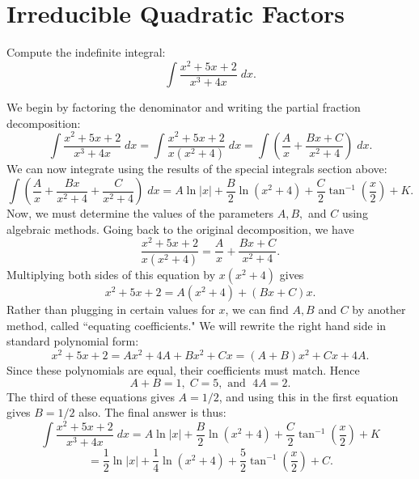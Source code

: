 \documentclass{ximera}
\begin{document}
\section{Irreducible Quadratic Factors}


\begin{example}[example 7]

Compute the indefinite integral:
\[
\int \frac{x^2 + 5x + 2}{x^3 + 4x} \; dx.
\]

We begin by factoring the denominator and writing the partial fraction decomposition:
\[
\int \frac{x^2 + 5x + 2}{x^3 + 4x} \; dx = \int \frac{x^2 + 5x + 2}{x(x^2 + 4)} \; dx = \int \left(\frac{A}{x} + \frac{Bx+C}{x^2+4} \right) \; dx.
\]
We can now integrate using the results of the special integrals section above:
\[
\int \left(\frac{A}{x} + \frac{Bx}{x^2+4} + \frac{C}{x^2+4} \right) \; dx = A\ln|x| + \frac{B}{2}\ln(x^2 +4 ) + \frac{C}{2}\tan^{-1}\left(\frac{x}{2}\right) + K.
\]
Now, we must determine the values of the parameters $A, B, $ and $C$ using algebraic methods.
Going back to the original decomposition, we have
\[
\frac{x^2 + 5x + 2}{x(x^2 + 4)} = \frac{A}{x} + \frac{Bx+C}{x^2+4}.
\]
Multiplying both sides of this equation by $x(x^2 +4)$ gives
\[
x^2 + 5x + 2 = A(x^2 +4)+ (Bx + C)x.
\]
Rather than plugging in certain values for $x$, we can find $A, B$ and $C$ by another method, called ``equating coefficients."
We will rewrite the right hand side in standard polynomial form:
\[
x^2 + 5x + 2 = Ax^2 + 4A + Bx^2 + Cx = (A+B)x^2 + Cx + 4A.
\]
Since these polynomials are equal, their coefficients must match.  Hence
\[
A+B = 1,\; C = 5, \text { and } \; 4A = 2.
\]
The third of these equations gives $A = 1/2$, and using this in the first equation gives $B = 1/2$ also.
The final answer is thus:
\[
\int \frac{x^2 + 5x + 2}{x^3 + 4x} \; dx = A\ln|x| + \frac{B}{2}\ln(x^2 +4 ) + \frac{C}{2}\tan^{-1}\left(\frac{x}{2}\right) + K
\]
\[
= \frac12\ln|x| + \frac{1}{4}\ln(x^2 +4 ) + \frac{5}{2}\tan^{-1}\left(\frac{x}{2}\right) + C.
\]

\end{example}



\begin{center}
\begin{foldable}
\end{foldable}
\end{center}
\end{document}

